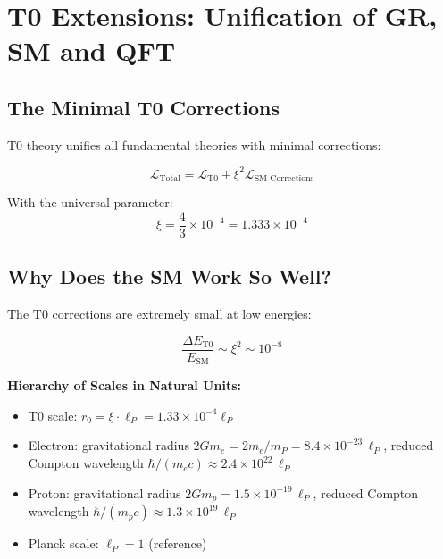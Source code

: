	\section{T0 Extensions: Unification of GR, SM and QFT}
	
	\subsection{The Minimal T0 Corrections}
	
	T0 theory unifies all fundamental theories with minimal corrections:
	
	\begin{t0box}[T0 Unification]
		\begin{equation}
			\mathcal{L}_{\text{Total}} = \mathcal{L}_{\text{T0}} + \xi^2 \mathcal{L}_{\text{SM-Corrections}}
		\end{equation}
		
		With the universal parameter:
		\begin{equation}
			\xi = \frac{4}{3} \times 10^{-4} = 1.333 \times 10^{-4}
		\end{equation}
	\end{t0box}
	
	\subsection{Why Does the SM Work So Well?}
	
	The T0 corrections are extremely small at low energies:
	
	\begin{equation}
		\frac{\Delta E_{\text{T0}}}{E_{\text{SM}}} \sim \xi^2 \sim 10^{-8}
	\end{equation}
	
	\textbf{Hierarchy of Scales in Natural Units:}
	\begin{itemize}
		\item T0 scale: $r_0 = \xi \cdot \ell_P = 1.33 \times 10^{-4} \ell_P$
		\item Electron: gravitational radius $2Gm_e = 2m_e/m_P = 8.4 \times 10^{-23}\,\ell_P$, reduced Compton wavelength $\hbar/(m_e c) \approx 2.4 \times 10^{22}\,\ell_P$
		\item Proton: gravitational radius $2Gm_p = 1.5 \times 10^{-19}\,\ell_P$, reduced Compton wavelength $\hbar/(m_p c) \approx 1.3 \times 10^{19}\,\ell_P$
		\item Planck scale: $\ell_P = 1$ (reference)
	\end{itemize}
	
